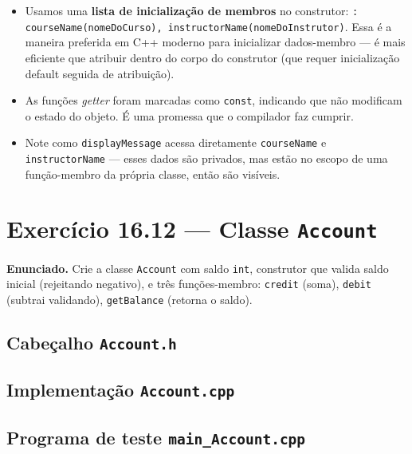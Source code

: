 \documentclass[11pt,a4paper]{article}
\begin{document}
\begin{itemize}[leftmargin=*]
  \item Usamos uma \textbf{lista de inicializa\c{c}\~ao de membros} no construtor: \texttt{: courseName(nomeDoCurso), instructorName(nomeDoInstrutor)}. Essa \'e a maneira preferida em C++ moderno para inicializar dados-membro --- \'e mais eficiente que atribuir dentro do corpo do construtor (que requer inicializa\c{c}\~ao default seguida de atribui\c{c}\~ao).
  \item As fun\c{c}\~oes \emph{getter} foram marcadas como \texttt{const}, indicando que n\~ao modificam o estado do objeto. \'E uma promessa que o compilador faz cumprir.
  \item Note como \texttt{displayMessage} acessa diretamente \texttt{courseName} e \texttt{instructorName} --- esses dados s\~ao privados, mas est\~ao no escopo de uma fun\c{c}\~ao-membro da pr\'opria classe, ent\~ao s\~ao vis\'iveis.
\end{itemize}

\newpage
\section{Exerc\'icio 16.12 --- Classe \texttt{Account}}

\begin{enunciado}
\textbf{Enunciado.} Crie a classe \texttt{Account} com saldo \texttt{int}, construtor que valida saldo inicial (rejeitando negativo), e tr\^es fun\c{c}\~oes-membro: \texttt{credit} (soma), \texttt{debit} (subtrai validando), \texttt{getBalance} (retorna o saldo).
\end{enunciado}

\subsection*{Cabe\c{c}alho \texttt{Account.h}}



\subsection*{Implementa\c{c}\~ao \texttt{Account.cpp}}



\subsection*{Programa de teste \texttt{main\_Account.cpp}}
\end{document}
